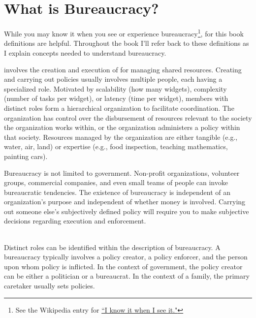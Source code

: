 \section{What is Bureaucracy?\label{sec:define-bureaucracy}}

While you may know it when you see or experience bureaucracy\footnote{See the Wikipedia entry for \href{https://en.wikipedia.org/wiki/I_know_it_when_I_see_it}{``I know it when I see it."}}, for this book definitions are helpful. Throughout the book I'll refer back to these definitions as I explain concepts needed to understand bureaucracy.

\iftoggle{glossaryinmargin}{\marginpar{[Glossary]}}{}
\iftoggle{glossarysubstitutionworks}{\Gls{bureaucracy}}{Bureaucracy} involves the creation and execution of 
\iftoggle{glossarysubstitutionworks}{\glspl{policy}}{policies} for managing shared resources. 
Creating and carrying out policies usually involves multiple people, each having a specialized role. Motivated by scalability (how many widgets), complexity (number of tasks per widget), or latency (time per widget), members with distinct roles form a hierarchical organization to facilitate coordination. The organization has control over the disbursement of resources relevant to the society the organization works within, or the organization administers a policy within that society. Resources managed by the organization are either tangible (e.g., water, air, land) or expertise (e.g., food inspection, teaching mathematics, painting cars).  

Bureaucracy is not limited to government. Non-profit organizations, volunteer groups, commercial companies, and even small teams of people can invoke bureaucratic tendencies. The existence of bureaucracy is independent of an organization's purpose and independent of whether money is involved. Carrying out someone else's subjectively defined policy will require you to make subjective decisions regarding execution and enforcement. 

\ \\

Distinct roles can be identified within the description of bureaucracy.
A bureaucracy typically involves a policy creator, a policy enforcer, and the person upon whom policy is inflicted. In the context of government, the policy creator can be either a politician or a bureaucrat. In the context of a family, the primary caretaker usually sets policies.

